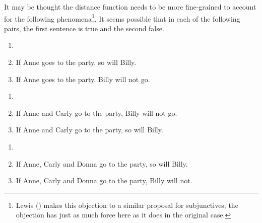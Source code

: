 \documentclass[
  11pt,
  letterpaper,
  DIV=11,
  numbers=noendperiod,
  twoside]{scrartcl}
\providecommand{\tightlist}{%
  \setlength{\itemsep}{0pt}\setlength{\parskip}{0pt}}\usepackage{longtable,booktabs,array}
\begin{document}
It may be thought the distance function needs to be more fine-grained to
account for the following phenomena\footnote{Lewis
  () makes this objection to a similar
  proposal for subjunctives; the objection has just as much force here
  as it does in the original case.}. It seems possible that in each of
the following pairs, the first sentence is true and the second false.

\begin{description}
\tightlist
\item[(19)]
\begin{enumerate}
\def\labelenumi{\alph{enumi}.}
\tightlist
\item[]
\item
  If Anne goes to the party, so will Billy.
\item
  If Anne goes to the party, Billy will not go.
\end{enumerate}
\item[(20)]
\begin{enumerate}
\def\labelenumi{\alph{enumi}.}
\tightlist
\item[]
\item
  If Anne and Carly go to the party, Billy will not go.
\item
  If Anne and Carly go to the party, so will Billy.
\end{enumerate}
\item[(21)]
\begin{enumerate}
\def\labelenumi{\alph{enumi}.}
\tightlist
\item[]
\item
  If Anne, Carly and Donna go to the party, so will Billy.
\item
  If Anne, Carly and Donna go to the party, Billy will not.
\end{enumerate}
\end{description}
\end{document}
